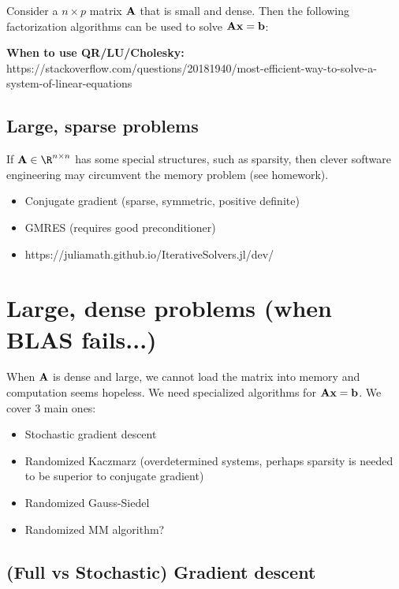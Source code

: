 \documentclass[./some_latex_template.tex]{subfiles}
\begin{document}
Consider a $n \times p$ matrix $\mathbf{A}$ that is small and dense. Then the following factorization algorithms can be used to solve $\mathbf{A} \mathbf{x} = \mathbf{b}$:

\textbf{When to use QR/LU/Cholesky:}\\
https://stackoverflow.com/questions/20181940/most-efficient-way-to-solve-a-system-of-linear-equations

\subsection{Large, sparse problems}

If $\bA \in \R^{n \times n}$ has some special structures, such as sparsity, then clever software engineering may circumvent the memory problem (see homework).

\begin{itemize}
	\item Conjugate gradient (sparse, symmetric, positive definite)
	\item GMRES (requires good preconditioner)
	\item https://juliamath.github.io/IterativeSolvers.jl/dev/
\end{itemize}

\section{Large, dense problems (when BLAS fails...)}

When $\mathbf{A}$ is dense and large, we cannot load the matrix into memory and computation seems hopeless. We need specialized algorithms for $\mathbf{A} \mathbf{x} = \mathbf{b}$. We cover 3 main ones:
\begin{itemize}
	\item Stochastic gradient descent
	\item Randomized Kaczmarz (overdetermined systems, perhaps sparsity is needed to be superior to conjugate gradient)
	\item Randomized Gauss-Siedel
	\item Randomized MM algorithm?
\end{itemize}

\subsection{(Full vs Stochastic) Gradient descent}
\end{document}
